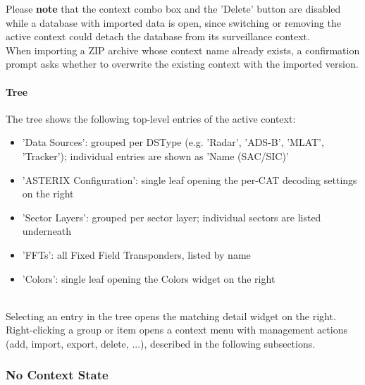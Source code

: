 Please \textbf{note} that the context combo box and the 'Delete' button are disabled while a database with imported data is open, since switching or removing the active context could detach the database from its surveillance context. \\

When importing a ZIP archive whose context name already exists, a confirmation prompt asks whether to overwrite the existing context with the imported version. \\

\paragraph{Tree}

The tree shows the following top-level entries of the active context:

\begin{itemize}
\item 'Data Sources': grouped per DSType (e.g. 'Radar', 'ADS-B', 'MLAT', 'Tracker'); individual entries are shown as 'Name (SAC/SIC)'
\item 'ASTERIX Configuration': single leaf opening the per-CAT decoding settings on the right
\item 'Sector Layers': grouped per sector layer; individual sectors are listed underneath
\item 'FFTs': all Fixed Field Transponders, listed by name
\item 'Colors': single leaf opening the Colors widget on the right
\end{itemize}
\ \\

Selecting an entry in the tree opens the matching detail widget on the right. Right-clicking a group or item opens a context menu with management actions (add, import, export, delete, ...), described in the following subsections. \\











\subsubsection{No Context State}

